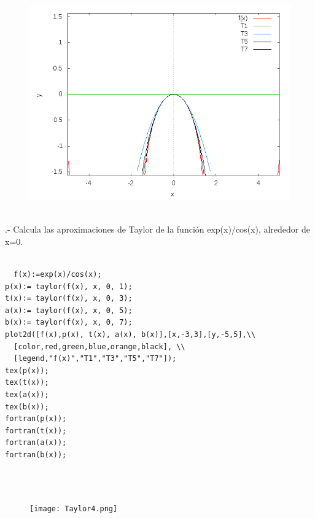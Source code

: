 \documentclass[12pt]{article}
\begin{document}
  \begin{center}
  \begin{figure}[b]
\includegraphics[scale=0.5]{taylorlogcosbien.png}
\end{figure}
  \end{center}\\
  .- Calcula las aproximaciones de Taylor de la función exp(x)/cos(x), alrededor de x=0.\\
  \begin{verbatim}
  
  f(x):=exp(x)/cos(x);
p(x):= taylor(f(x), x, 0, 1);
t(x):= taylor(f(x), x, 0, 3);
a(x):= taylor(f(x), x, 0, 5);
b(x):= taylor(f(x), x, 0, 7);
plot2d([f(x),p(x), t(x), a(x), b(x)],[x,-3,3],[y,-5,5],\\
  [color,red,green,blue,orange,black], \\
  [legend,"f(x)","T1","T3","T5","T7"]);
tex(p(x));
tex(t(x));
tex(a(x));
tex(b(x));
fortran(p(x));
fortran(t(x));
fortran(a(x));
fortran(b(x));


     \end{verbatim}\\
  
  
 
  \begin{center}
 \begin{figure}[b]
\texttt{[image: Taylor4.png]}
\end{figure}
 \end{center}\\
 \newpage
\end{document}

